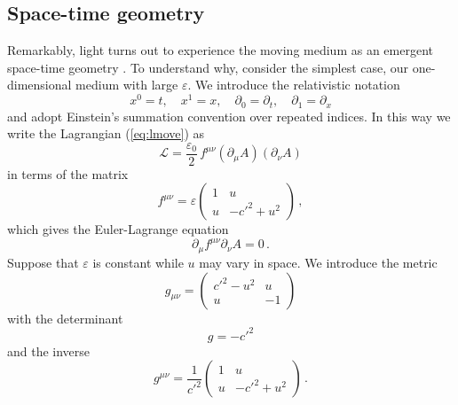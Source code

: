 \documentclass[12pt,amsmath,amssymb]{article}
\numberwithin{equation}{section}
\begin{document}
\subsection{Space-time geometry}

Remarkably, light turns out to experience the moving medium
as an emergent space-time geometry
\cite{Gordon,LeoPiwstor,LeoSpace,Nov,PhamMauQuan1,PhamMauQuan2}.
To understand why, consider the simplest case, our one-dimensional
medium with large $\varepsilon$.
We introduce the relativistic notation
\begin{equation}
x^0 = t,\quad x^1 = x,\quad
\partial_0=\partial_t,\quad\partial_1=\partial_x
\end{equation}
and adopt Einstein's summation convention over repeated indices.
In this way we write the Lagrangian (\ref{eq:lmove}) as
\begin{equation}
{\mathscr L}=\frac{\varepsilon_0}{2}\,
f^{\mu\nu} (\partial_\mu A)(\partial_\nu A)
\end{equation}
in terms of the matrix
\begin{equation}
  f^{\mu \nu} = \varepsilon \left(
    \begin{array}{cc}
      1 & u \\
      u & -c'^2  + u^2
    \end{array}
\right) \, ,
\end{equation}
which gives the Euler-Lagrange equation
\begin{equation}
\label{eq:wavef}
\partial_\mu f^{\mu\nu} \partial_\nu A = 0 \,.
\end{equation}
Suppose that $\varepsilon$ is constant while $u$ may vary in space.
We introduce the metric
\begin{equation}
\label{eq:metric}
  g_{\mu \nu} = \left(
    \begin{array}{cc}
      c'^2-u^2 & u \\
      u & -1
    \end{array}
\right)
\end{equation}
with the determinant \cite{LL2}
\begin{equation}
g = -c'^2
\end{equation}
and the inverse
\begin{equation}
  g^{\mu \nu} = \frac{1}{c'^2} \left(
    \begin{array}{cc}
      1 & u \\
      u & -c'^2  + u^2
    \end{array}
\right) \, .
\end{equation}
\end{document}
